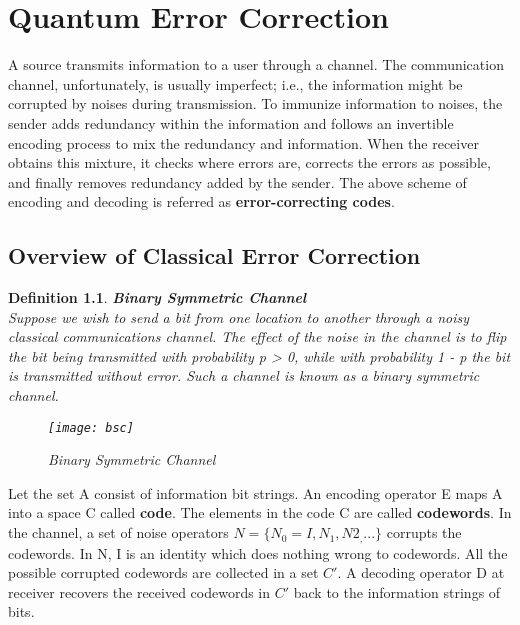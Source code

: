 \documentclass[12pt]{report}
\begin{document}
\chapter{Quantum Error Correction}
\newtheorem{thm1}{Theorem}[chapter]
\newtheorem{defn1}[thm1]{Definition}
A source transmits information to a user through a channel. The communication channel, unfortunately, is usually imperfect; i.e., the information might be corrupted by noises during transmission. To immunize information to noises, the sender adds redundancy within the information and follows an invertible encoding process to mix the redundancy and information. When the receiver obtains this mixture, it checks where errors are, corrects the errors as possible, and finally removes redundancy added by the sender. The above scheme of encoding and decoding is referred as \textbf{error-correcting codes}.
\section{Overview of Classical Error Correction}
\begin{defn1}
\textbf{Binary Symmetric Channel}\\
Suppose we wish to send a bit from one location to another through a noisy classical communications channel. The effect of the noise in the channel is to flip the bit being transmitted with probability p > 0, while with probability 1 - p the bit is transmitted without error. Such a channel is known as a binary symmetric channel.
\begin{figure}[h]
\centering
\texttt{[image: bsc]}
\caption{Binary Symmetric Channel}
\label{fig:bsc}
\end{figure}
\end{defn1}
Let the set A consist of information bit strings. An encoding operator E maps A into a space C called \textbf{code}. The elements in the code C are called \textbf{codewords}. In the channel, a set of noise operators $N = \{N_0 = I, N_1, N2_, ...\}$ corrupts the codewords. In N, I is an identity which does nothing wrong to codewords. All the possible corrupted codewords are collected in a set $C'$. A decoding operator D at receiver recovers the received codewords in $C'$ back to the information strings of bits.
\end{document}
